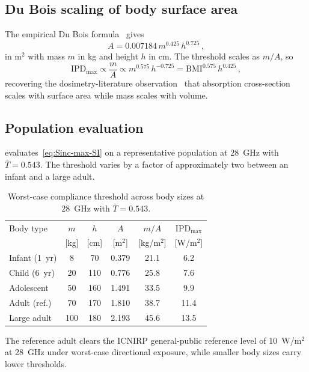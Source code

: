 \documentclass[journal,twocolumn,10pt]{IEEEtran}
\theoremstyle{plain}
\theoremstyle{remark}
\newcommand{\IPD}{\mathrm{IPD}}
\newcommand{\Tbar}{\bar{T}}
\begin{document}
\subsection{Du Bois scaling of body surface area}
The empirical Du Bois formula~\cite{DuBois1916} gives
\begin{equation}\label{eq:du-bois}
  A = 0.007184\,m^{0.425}\,h^{0.725}\, ,
\end{equation}
in m$^2$ with mass $m$ in kg and height $h$ in cm. The threshold
scales as $m/A$, so
\begin{equation}\label{eq:Sinc-anthro}
  \IPD_{\mathrm{max}} \propto \frac{m}{A}
  \propto m^{0.575}\,h^{-0.725}
  = \mathrm{BMI}^{0.575}\,h^{0.425}\, ,
\end{equation}
recovering the dosimetry-literature observation~\cite{Hirata2007corr,
Dimbylow2002} that absorption cross-section scales with surface area
while mass scales with volume.

\subsection{Population evaluation}
 evaluates~\eqref{eq:Sinc-max-SI} on a
representative population at 28~GHz with $\Tbar = 0.543$. The
threshold varies by a factor of approximately
two between an infant and a large adult.

\begin{table}[!t]
\centering
\footnotesize
\caption{Worst-case compliance threshold across body sizes at
28~GHz with $\Tbar = 0.543$.}
\label{tab:anthro-SI}
\setlength{\tabcolsep}{3.5pt}
\begin{tabular}{lccccc}
\toprule
Body type & $m$ & $h$ & $A$
  & $m/A$ & $\IPD_{\mathrm{max}}$ \\
          & [kg] & [cm] & [m$^2$]
  & [kg/m$^2$] & [W/m$^2$] \\
\midrule
Infant (1~yr)    &   8 &  70 & 0.379 & 21.1 &  6.2 \\
Child (6~yr)     &  20 & 110 & 0.776 & 25.8 &  7.6 \\
Adolescent       &  50 & 160 & 1.491 & 33.5 &  9.9 \\
Adult (ref.)     &  70 & 170 & 1.810 & 38.7 & 11.4 \\
Large adult      & 100 & 180 & 2.193 & 45.6 & 13.5 \\
\bottomrule
\end{tabular}
\end{table}

The reference adult clears the ICNIRP general-public reference
level of 10~W/m$^2$ at 28~GHz under worst-case directional
exposure, while smaller body sizes carry lower thresholds.
\end{document}

